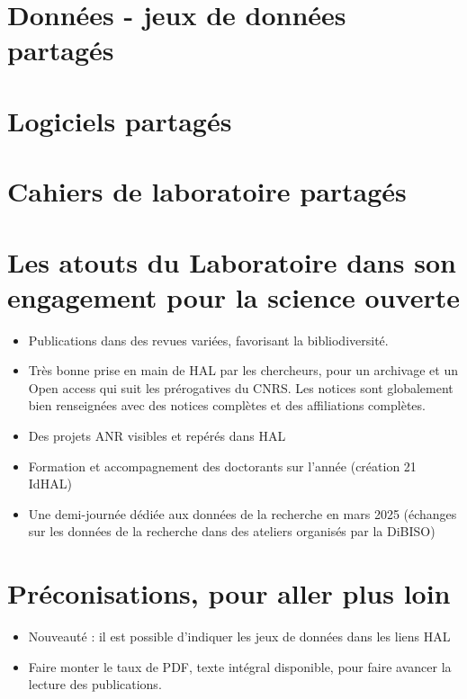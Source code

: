 \documentclass[french, 11pt]{../../dibiso/biso}
\begin{document}
\pagebreak

\section{Données - jeux de données partagés}



\section{Logiciels partagés}



\section{Cahiers de laboratoire partagés}




\pagebreak

\section{Les atouts du Laboratoire dans son engagement pour la science ouverte}

\begin{itemize}
  \item Publications dans des revues variées, favorisant la bibliodiversité.
  \item Très bonne prise en main de HAL par les chercheurs, pour un archivage et un Open access qui suit les prérogatives du CNRS. Les notices sont globalement bien renseignées avec des notices complètes et des affiliations complètes.
  \item Des projets ANR visibles et repérés dans HAL
  \item Formation et accompagnement des doctorants sur l’année (création 21 IdHAL)
  \item Une demi-journée dédiée aux données de la recherche en mars 2025 (échanges sur les données de la recherche dans des ateliers organisés par la DiBISO)
\end{itemize}


\section{Préconisations, pour aller plus loin}

\begin{itemize}
  \item Nouveauté : il est possible d’indiquer les jeux de données dans les liens HAL 
  \item Faire monter le taux de PDF, texte intégral disponible, pour faire avancer la lecture des publications.
\end{itemize}
\end{document}
